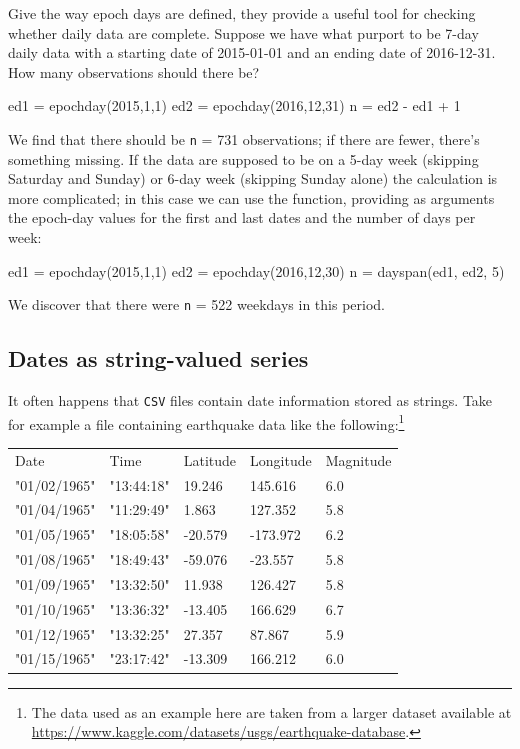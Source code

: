 Give the way epoch days are defined, they provide a useful tool for
checking whether daily data are complete. Suppose we have what purport
to be 7-day daily data with a starting date of 2015-01-01 and an
ending date of 2016-12-31. How many observations should there be?
%
\begin{code}
ed1 = epochday(2015,1,1)
ed2 = epochday(2016,12,31)
n = ed2 - ed1 + 1
\end{code}
We find that there should be \texttt{n} = 731 observations; if there
are fewer, there's something missing. If the data are supposed to be
on a 5-day week (skipping Saturday and Sunday) or 6-day week (skipping
Sunday alone) the calculation is more complicated; in this case we can
use the  function, providing as arguments the
epoch-day values for the first and last dates and the number of days
per week:
\begin{code}
ed1 = epochday(2015,1,1)
ed2 = epochday(2016,12,30)
n = dayspan(ed1, ed2, 5)
\end{code}
%
We discover that there were \texttt{n} = 522 weekdays in this period.

\subsection{Dates as string-valued series}

It often happens that \texttt{CSV} files contain date information
stored as strings. Take for example a file containing earthquake data
like the following:\footnote{The data used as an example here are
  taken from a larger dataset available at
  \url{https://www.kaggle.com/datasets/usgs/earthquake-database}.}

\begin{center}
  \begin{small}
      \begin{tabular}{lllll}
        Date	& Time	& Latitude	& Longitude                & Magnitude \\
        "01/02/1965"	& "13:44:18"	& 19.246	& 145.616  & 6.0       \\
        "01/04/1965"	& "11:29:49"	& 1.863	& 127.352          & 5.8       \\
        "01/05/1965"	& "18:05:58"	& -20.579	& -173.972 & 6.2       \\
        "01/08/1965"	& "18:49:43"	& -59.076	& -23.557  & 5.8       \\
        "01/09/1965"	& "13:32:50"	& 11.938	& 126.427  & 5.8       \\
        "01/10/1965"	& "13:36:32"	& -13.405	& 166.629  & 6.7       \\
        "01/12/1965"	& "13:32:25"	& 27.357	& 87.867   & 5.9       \\
        "01/15/1965"	& "23:17:42"	& -13.309	& 166.212  & 6.0       
      \end{tabular}
  \end{small}
\end{center}

